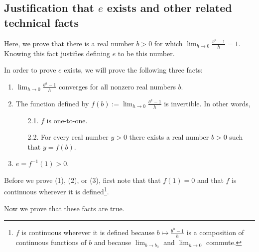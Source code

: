 \subsection*{Justification that $e$ exists and other related technical facts}

Here, we prove that there is a real number $b > 0$ for which $\lim_{h \rightarrow 0} \frac{b^h - 1}{h} = 1$. Knowing this fact justifies defining $e$ to be this number.

In order to prove $e$ exists, we will prove the following three facts:

\begin{enumerate}
    \item $\lim_{h \rightarrow 0} \frac{b^h - 1}{h}$ converges for all nonzero real numbers $b$.
    \item The function defined by $f(b) := \lim_{h \rightarrow 0} \frac{b^h - 1}{h}$ is invertible. In other words, 
    \begin{enumerate}
        \item[2.1.] $f$ is one-to-one.
        \item[2.2.] For every real number $y > 0$ there exists a real number $b > 0$ such that $y = f(b)$.
    \end{enumerate}
    \item $e = f^{-1}(1) > 0$.
\end{enumerate}

Before we prove (1), (2), or (3), first note that that $f(1) = 0$ and that $f$ is continuous wherever it is defined\footnote{$f$ is continuous wherever it is defined because $b \mapsto \frac{b^h - 1}{h}$ is a composition of continuous functions of $b$ and because $\lim_{b \rightarrow b_0}$ and $\lim_{h \rightarrow 0}$ commute.}. 

\vspace{.25cm}

Now we prove that these facts are true.

